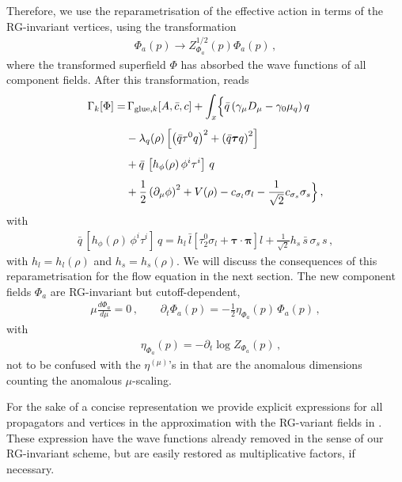 \documentclass[aps,twocolumn,prd,superscriptaddress]{revtex4-2}
\begin{document}
Therefore, we use the reparametrisation of the effective action  in terms of the RG-invariant vertices, using the transformation 
%
\begin{align}
	\Phi _{a}(p) \to  Z^{1/2}_{\Phi_a}(p) \Phi_{a}(p)\,, 
	\label{eq:barPhi}
\end{align}
%
where the transformed superfield $\Phi$ has absorbed the wave functions of all component fields. After this transformation,  reads 
%
\begin{align}\nonumber
	\Gamma_k[\Phi] = & \,\Gamma_{\textrm{glue},k} [A,\bar c,c] + 	\int_x \Bigl\{\bar q  \left( \gamma_\mu D_\mu-\gamma_0 \mu_q \right)q \\[1ex]\nonumber
	& -  \lambda_q(\rho) \left[ \left(\bar q \tau^0 q\right)^2 + \left(\bar q \bm \tau q \right)^2 \right]          \\[1ex]\nonumber
& + \bar q\,\left[ h_\phi(\rho)\,\phi^i \tau^i\right] \,q         \\[1ex]    
	& +\frac{1}{2}  \left(\partial_\mu \phi \right)^2 +  V( \rho) -c_{\sigma_l}  \sigma_l- \frac{1}{\sqrt{2}} c_{\sigma_s} \sigma_s
	\Bigr\}\,,
	\label{eq:BareffAct}
\end{align}
%
with 
%
\begin{align} 
	\bar q\,\left[ h_\phi(\rho)\,\phi^i \tau^i\right] \,q   =  h_l \,\bar l  \left[\tau^0_2 \sigma_l + \bm{\tau} \cdot \bm \pi\right] l +  \frac{1}{\sqrt{2}}h_s\,\bar s  \,\sigma_s \,s\,, 
\end{align}
%
with $h_l=h_l(\rho)$ and $h_s=h_s(\rho)$. We will discuss the consequences of this reparametrisation for the flow equation in the next section. The new component fields $\Phi_a$ are RG-invariant but cutoff-dependent, 
%
\begin{align}
	\mu\frac{d \Phi_a}{d \mu}=0\,,\qquad \partial_t \Phi_a(p)= -\frac12 \eta^{\ }_{\Phi_a}(p) \,\Phi_a(p)\,,
	\label{eq:RG+FRGscalingbarPhi}
\end{align}
%
with 
%
\begin{align}
\quad \eta^{\ }_{\Phi_a}(p) = - \partial_t \log Z_{\Phi_a}(p)\,, 
\label{eq:etaPhi}
\end{align}
%
not to be confused with the $\eta^{(\mu)}$'s in  that are the anomalous dimensions counting the anomalous $\mu$-scaling. 

For the sake of a concise representation we provide explicit expressions for all propagators and vertices in the approximation  with the RG-variant fields in . These expression have the wave functions already removed in the sense of our RG-invariant scheme, but are easily restored as multiplicative factors, if necessary.
\end{document}
